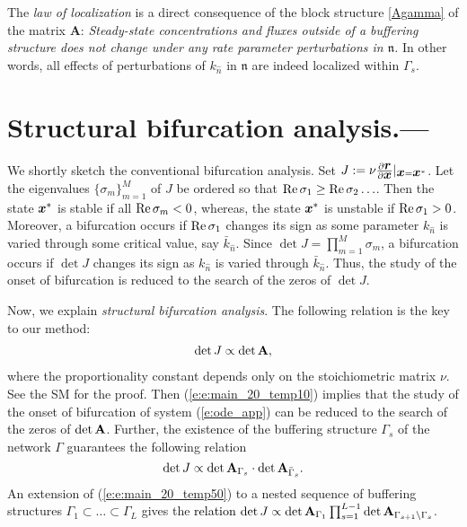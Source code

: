 \documentclass[ amsmath,amssymb,nofootinbib
]{revtex4-1}
\def\mbf#1{\mbox{\boldmath $#1$}}
\newcommand{\bS}{{\bf S}}
\newcommand{\bx}{{\mbf x}}
\newcommand{\br}{{\mbf r}}
\newcommand{\p}{\partial}
\newcommand{\detA}{{\rm det}\,  {\bf A}}
\newcommand{\red}[1]{\textcolor{black}{#1}}
\newcommand{\corr}[1]{\textcolor{black}{#1}}
\begin{document}
{ The  {\it law of localization } \cite{OM} is a direct consequence of the block structure \eqref{Agamma} of the matrix {\bf A}: } {\it {Steady-state  concentrations and  fluxes} outside of a buffering structure does not change under any rate parameter perturbations in $\mathfrak n$.}  In other words, all effects of perturbations of $k_{\hat{n}}$ in $\mathfrak n$ are indeed localized within $\Gamma_s$.



\section{ Structural bifurcation analysis.---}
We shortly sketch the conventional bifurcation analysis. Set $J:=\nu \frac{\p \br}{\p \bx}|_{\bx=\bx^*}$. 
Let the eigenvalues $\{\sigma_m\}_{m=1}^M$ of $J$ be ordered so that
${\rm Re}\, \sigma_1 \ge {\rm Re}\, \sigma_2 \ldots$.
Then the state $\bx^*$ is stable if all ${\rm Re}\, \sigma_m < 0$,
whereas, the state $\bx^*$ is unstable if ${\rm Re}\, \sigma_1 > 0$.
Moreover,
a bifurcation occurs if ${\rm Re}\, \sigma_1$ changes its sign
as some parameter $k_{\hat n}$ is varied through some critical value, say $\bar{k}_{\hat n}$.
Since $\det J  = \prod_{m=1}^M\sigma_m$,
a bifurcation  occurs if $\det J$ changes its sign
as $k_{\hat n}$ is varied through $\bar{k}_{\hat n}$.
Thus, the study of  the onset of bifurcation is reduced to the search of the zeros of $\det J$.

Now, we explain {\it structural bifurcation analysis}. 
The following relation is the key to our method: 
\begin{align} \label{e:e:main_20_temp10}
    \det J  \propto \det {\bf A},
\end{align}
where %
the proportionality constant depends only on the stoichiometric matrix $\nu$. See the SM for the proof.
Then (\ref{e:e:main_20_temp10}) implies that 
the study of  the onset of bifurcation of system (\ref{e:ode_app})
can be reduced to the search of the zeros of $\detA$.
Further, 
the existence of the buffering structure $\Gamma_s$ of the network $\Gamma$
guarantees the following relation
\corr{
\begin{equation} \label{e:e:main_20_temp50}
     \det J   \propto \det {\bf A}_{\Gamma_s} \cdot \det {\bf A}_{\bar \Gamma_s}.
\end{equation}
}
An extension of (\ref{e:e:main_20_temp50}) to a nested sequence of buffering structures 
$\Gamma_1\subset \ldots \subset \Gamma_L$ gives the \red{relation}
$\det J \propto \det {\bf A}_{\Gamma_1} \prod_{s=1}^{L-1}  \det {\bf A}_{{\Gamma_{s+1}} \backslash {\Gamma_s}}$.
\end{document}

